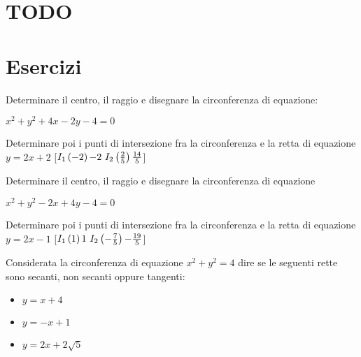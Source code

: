 
\section{TODO}

\section{Esercizi}

% 

\begin{esercizio}\label{ese:}
Determinare il centro, il raggio e disegnare la circonferenza di equazione:

\(x^2+y^2+4x-2y-4=0\)

Determinare poi i punti di intersezione fra la circonferenza e la retta di 
equazione 
\(y=2x+2\) 
\hfill [\(I_1\left( -2 \right){-2}~I_2\left( \frac{2}{5} \right){\frac{14}{5}}\)]
\end{esercizio}

\begin{esercizio}\label{ese:}
Determinare il centro, il raggio e disegnare la circonferenza di equazione

\(x^2+y^2-2x+4y-4=0\)

Determinare poi i punti di intersezione fra la circonferenza e la retta di 
equazione \(y=2x-1\) 
\hfill [\(I_1\left( 1 \right){1}~I_2\left( -\frac{7}{5} \right){-\frac{19}{5}}\)]
\end{esercizio}

\begin{esercizio}\label{ese:}
Considerata la circonferenza di equazione \(x^2 +y^2 = 4\) dire se le seguenti 
rette sono secanti, non secanti oppure tangenti:
\begin{itemize} [nosep]
 \item \(y=x+4\)
 \item \(y=-x+1\)
 \item \(y=2x+2\sqrt{5}\)
\end{itemize}
\end{esercizio}

